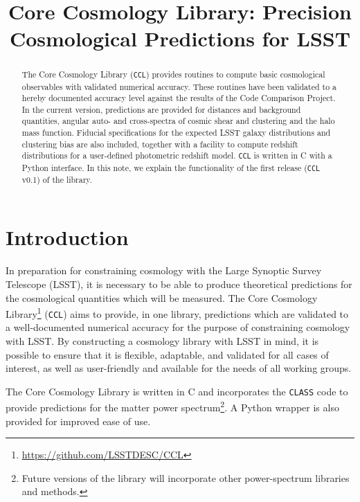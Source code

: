 \documentclass[\docopts]{\docclass}
\begin{document}
\title{Core Cosmology Library: Precision Cosmological Predictions for LSST}

\maketitlepre

\begin{abstract}

The Core Cosmology Library ({\tt CCL}) provides routines to compute basic cosmological observables with validated numerical accuracy. These routines have been validated to a hereby documented accuracy level against the results of the Code Comparison Project. In the current version, predictions are provided for distances and background quantities, angular auto- and cross-spectra of cosmic shear and clustering and the halo mass function. Fiducial specifications for the expected LSST galaxy distributions and clustering bias are also included, together with a facility to compute redshift distributions for a user-defined photometric redshift model. {\tt CCL} is written in C with a Python interface. In this note, we explain the functionality of the first release ({\tt CCL} v0.1) of the library.

\end{abstract}


\maketitlepost

\newpage
\tableofcontents{}
\newpage

\section{Introduction}
\label{sec:intro}

In preparation for constraining cosmology with the Large Synoptic Survey Telescope (LSST), it is necessary to be able to produce theoretical predictions for the cosmological quantities which will be measured. The Core Cosmology Library\footnote{\url{https://github.com/LSSTDESC/CCL}} ({\tt CCL}) aims to provide, in one library, predictions which are validated to a well-documented numerical accuracy for the purpose of constraining cosmology with LSST. By constructing a cosmology library with LSST in mind, it is possible to ensure that it is flexible, adaptable, and validated for all cases of interest, as well as user-friendly and available for the needs of all working groups.

The Core Cosmology Library is written in C and incorporates the {\tt CLASS} code \cite{class} to provide predictions for the matter power spectrum\footnote{Future versions of the library will incorporate other power-spectrum libraries and methods.}. A Python wrapper is also provided for improved ease of use.
\end{document}
